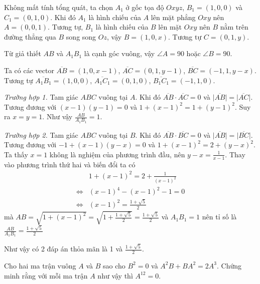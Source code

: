 \begin{solution}
    Không mất tính tổng quát, ta chọn $A_1$ ở gốc tọa độ $Oxyz$, 
    $B_1 = (1, 0, 0)$ và $C_1 = (0, 1, 0)$. Khi đó $A_1$ là hình
    chiếu của $A$ lên mặt phẳng $Oxy$ nên $A = (0, 0, 1)$. Tương
    tự, $B_1$ là hình chiếu của $B$ lên mặt $Oxy$ nên $B$ nằm
    trên đường thẳng qua $B$ song song $Oz$, vậy $B = (1, 0, x)$.
    Tương tự $C = (0, 1, y)$.

    Từ giả thiết $AB$ và $A_1 B_1$ là cạnh góc vuông, vậy $\angle A = 90$
    hoặc $\angle B = 90$.

    Ta có các vector $\overline{AB} = (1, 0, x-1)$, $\overline{AC} = (0, 1, y-1)$,
    $\overline{BC} = (-1, 1, y-x)$.
    Tương tự $\overline{A_1 B_1} = (1, 0, 0)$, $\overline{A_1 C_1} = (0, 1, 0)$,
    $\overline{B_1 C_1} = (-1, 1, 0)$.

    \textit{Trường hợp 1.} Tam giác $ABC$ vuông tại $A$. Khi đó
    $\overline{AB} \cdot \overline{AC} = 0$ và $\lvert \overline{AB}
    \rvert = \lvert \overline{AC} \rvert$. Tương đương với $(x-1)(y-1) = 0$
    và $1 + (x-1)^2 = 1 + (y-1)^2$. Suy ra $x = y = 1$. Như vậy 
    $\frac{AB}{A_1 B_1} = 1$.

    \textit{Trường hợp 2.} Tam giác $ABC$ vuông tại $B$. Khi đó
    $\overline{AB} \cdot \overline{BC} = 0$ và $\lvert \overline{AB} \rvert
    = \lvert \overline{BC} \rvert$. Tương đương với $-1 + (x-1)(y-x) = 0$
    và $1 + (x-1)^2 = 2 + (y-x)^2$. Ta thấy $x = 1$ không là nghiệm
    của phương trình đầu, nên $y - x = \frac{1}{x-1}$. Thay vào phương
    trình thứ hai và biến đổi ta có
    \begin{align*}
        & 1 + (x-1)^2 = 2 + \frac{1}{(x-1)^2} \\ 
        \Leftrightarrow & (x-1)^4 - (x-1)^2 - 1 = 0 \\ 
        \Leftrightarrow & (x-1)^2 = \frac{1+\sqrt{5}}{2}
    \end{align*}
    mà $AB = \sqrt{1 + (x-1)^2} = \sqrt{1 + \frac{1 + \sqrt{5}}{2}}
    = \frac{1 + \sqrt{5}}{2}$ và $A_1 B_1 = 1$ nên tỉ số là 
    $\frac{AB}{A_1 B_1} = \frac{1 + \sqrt{5}}{2}$

    Như vậy có 2 đáp án thỏa mãn là 1 và $\frac{1 + \sqrt{5}}{2}$.
\end{solution}

\begin{problem}{7}
    Cho hai ma trận vuông $A$ và $B$ sao cho $B^2 = 0$ và
    $A^2 B + B A^2 = 2A^3$. Chứng minh rằng với mỗi ma trận
    $A$ như vậy thì $A^{12} = 0$.
\end{problem}

